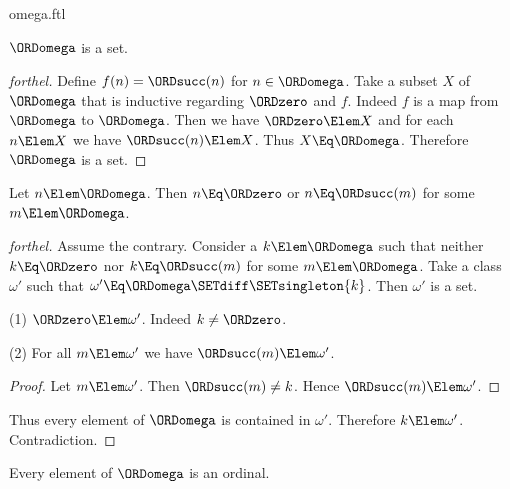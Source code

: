 \documentclass{stex}
\begin{document}
\begin{smodule}{omega.ftl}
\begin{corollary}[forthel]
  $\ORDomega$ is a set.
\end{corollary}
\begin{proof}[forthel]
  Define $f(n) = \ORDsucc(n)$ for $n \in \ORDomega$.
  Take a subset $X$ of $\ORDomega$ that is inductive regarding $\ORDzero$ and $f$.
  Indeed $f$ is a map from $\ORDomega$ to $\ORDomega$.
  Then we have $\ORDzero \Elem X$ and for each $n \Elem X$ we have $\ORDsucc(n) \Elem X$.
  Thus $X \Eq \ORDomega$.
  Therefore $\ORDomega$ is a set.
\end{proof}

\begin{proposition}[forthel]
  Let $n \Elem \ORDomega$.
  Then $n \Eq \ORDzero$ or $n \Eq \ORDsucc(m)$ for some $m \Elem \ORDomega$.
\end{proposition}
\begin{proof}[forthel]
  Assume the contrary.
  Consider a $k \Elem \ORDomega$ such that neither $k \Eq \ORDzero$ nor $k \Eq \ORDsucc(m)$ for
  some $m \Elem \ORDomega$.
  Take a class $\omega'$ such that $\omega' \Eq \ORDomega \SETdiff \SETsingleton{k}$. %
  Then $\omega'$ is a set.

  (1) $\ORDzero \Elem \omega'$.
  Indeed $k \neq \ORDzero$.

  (2) For all $m \Elem \omega'$ we have $\ORDsucc(m) \Elem \omega'$.
  \begin{proof}
    Let $m \Elem \omega'$.
    Then $\ORDsucc(m) \neq k$.
    Hence $\ORDsucc(m) \Elem \omega'$.
  \end{proof}

  Thus every element of $\ORDomega$ is contained in $\omega'$.
  Therefore $k \Elem \omega'$.
  Contradiction.
\end{proof}

\begin{proposition}[forthel]
  Every element of $\ORDomega$ is an ordinal.
\end{proposition}
\end{smodule}
\end{document}
